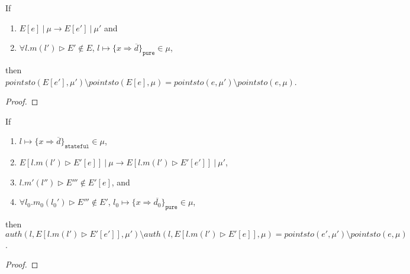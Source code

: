 \documentclass{llncs}
\newcommand{\keywadj}[1]{\mathtt{#1}}
\begin{document}
\begin{lemma} If
\begin{enumerate}
\item $E[e]~|~\mu \longrightarrow E[e']~|~\mu'$ and
\item $\forall l.m(l') \rhd E' \not\in E$, $l \mapsto \{ x \Rightarrow \overline{d} \}_{\keywadj{pure}} \in \mu$,
\end{enumerate}
then $pointsto(E[e'], \mu') \setminus pointsto(E[e], \mu) = pointsto(e, \mu') \setminus pointsto(e, \mu)$.
\end{lemma}

\begin{proof}
\end{proof}

\begin{lemma} If
\begin{enumerate}
\item $l \mapsto \{ x \Rightarrow \overline{d} \}_{\keywadj{stateful}} \in \mu$,
\item $E[l.m(l') \rhd E'[e]]~|~\mu \longrightarrow E[l.m(l') \rhd E'[e']]~|~\mu'$,
\item $l.m'(l'') \rhd E''' \not\in E'[e]$, and
\item $\forall l_0.m_0(l_0') \rhd E''' \not\in E'$, $l_0 \mapsto \{ x \Rightarrow \overline{d_0} \}_{\keywadj{pure}} \in \mu$,
\end{enumerate}
then $auth(l, E[l.m(l') \rhd E'[e']], \mu') \setminus auth(l, E[l.m(l') \rhd E'[e]], \mu) = pointsto(e', \mu') \setminus pointsto(e, \mu)$.
\end{lemma}

\begin{proof}
\end{proof}


\newpage
\end{document}
